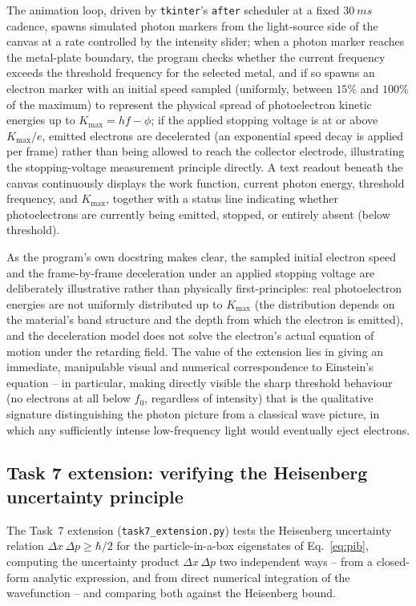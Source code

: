 \documentclass[11pt]{article}
\begin{document}
The animation loop, driven by \texttt{tkinter}'s \texttt{after} scheduler at a fixed $\SI{30}{ms}$ cadence, spawns simulated photon markers from the light-source side of the canvas at a rate controlled by the intensity slider; when a photon marker reaches the metal-plate boundary, the program checks whether the current frequency exceeds the threshold frequency for the selected metal, and if so spawns an electron marker with an initial speed sampled (uniformly, between $15\%$ and $100\%$ of the maximum) to represent the physical spread of photoelectron kinetic energies up to $K_\text{max}=hf-\phi$; if the applied stopping voltage is at or above $K_\text{max}/e$, emitted electrons are decelerated (an exponential speed decay is applied per frame) rather than being allowed to reach the collector electrode, illustrating the stopping-voltage measurement principle directly. A text readout beneath the canvas continuously displays the work function, current photon energy, threshold frequency, and $K_\text{max}$, together with a status line indicating whether photoelectrons are currently being emitted, stopped, or entirely absent (below threshold).

As the program's own docstring makes clear, the sampled initial electron speed and the frame-by-frame deceleration under an applied stopping voltage are deliberately illustrative rather than physically first-principles: real photoelectron energies are not uniformly distributed up to $K_\text{max}$ (the distribution depends on the material's band structure and the depth from which the electron is emitted), and the deceleration model does not solve the electron's actual equation of motion under the retarding field. The value of the extension lies in giving an immediate, manipulable visual and numerical correspondence to Einstein's equation -- in particular, making directly visible the sharp threshold behaviour (no electrons at all below $f_0$, regardless of intensity) that is the qualitative signature distinguishing the photon picture from a classical wave picture, in which any sufficiently intense low-frequency light would eventually eject electrons.

\subsection{Task 7 extension: verifying the Heisenberg uncertainty principle}
\label{sec:ext7}
The Task~7 extension (\texttt{task7\_extension.py}) tests the Heisenberg uncertainty relation $\Delta x\,\Delta p\ge\hbar/2$ for the particle-in-a-box eigenstates of Eq.~\eqref{eq:pib}, computing the uncertainty product $\Delta x\,\Delta p$ two independent ways -- from a closed-form analytic expression, and from direct numerical integration of the wavefunction -- and comparing both against the Heisenberg bound.
\end{document}
